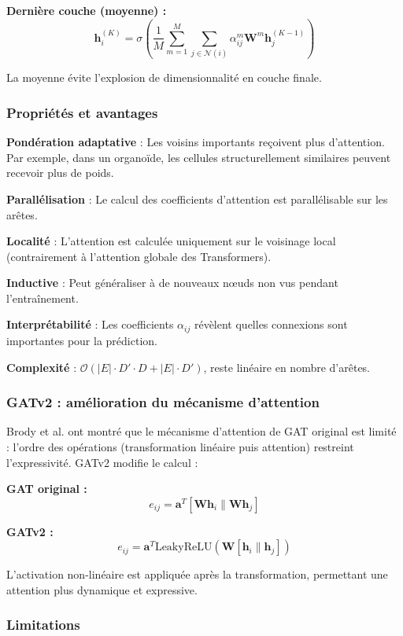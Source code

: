 \textbf{Dernière couche (moyenne) :}
\[
\mathbf{h}_i^{(K)} = \sigma\left(\frac{1}{M}\sum_{m=1}^M \sum_{j \in \mathcal{N}(i)} \alpha_{ij}^m \mathbf{W}^m\mathbf{h}_j^{(K-1)}\right)
\]

La moyenne évite l'explosion de dimensionnalité en couche finale.

\subsubsection{Propriétés et avantages}

\textbf{Pondération adaptative} : Les voisins importants reçoivent plus d'attention. Par exemple, dans un organoïde, les cellules structurellement similaires peuvent recevoir plus de poids.

\textbf{Parallélisation} : Le calcul des coefficients d'attention est parallélisable sur les arêtes.

\textbf{Localité} : L'attention est calculée uniquement sur le voisinage local (contrairement à l'attention globale des Transformers).

\textbf{Inductive} : Peut généraliser à de nouveaux nœuds non vus pendant l'entraînement.

\textbf{Interprétabilité} : Les coefficients $\alpha_{ij}$ révèlent quelles connexions sont importantes pour la prédiction.

\textbf{Complexité} : $\mathcal{O}(|E| \cdot D' \cdot D + |E| \cdot D')$, reste linéaire en nombre d'arêtes.

\subsubsection{GATv2 : amélioration du mécanisme d'attention}

Brody et al. ont montré que le mécanisme d'attention de GAT original est limité : l'ordre des opérations (transformation linéaire puis attention) restreint l'expressivité. GATv2 modifie le calcul :

\textbf{GAT original :}
\[
e_{ij} = \mathbf{a}^T [\mathbf{W}\mathbf{h}_i \| \mathbf{W}\mathbf{h}_j]
\]

\textbf{GATv2 :}
\[
e_{ij} = \mathbf{a}^T \text{LeakyReLU}\left(\mathbf{W}[\mathbf{h}_i \| \mathbf{h}_j]\right)
\]

L'activation non-linéaire est appliquée après la transformation, permettant une attention plus dynamique et expressive.

\subsubsection{Limitations}

